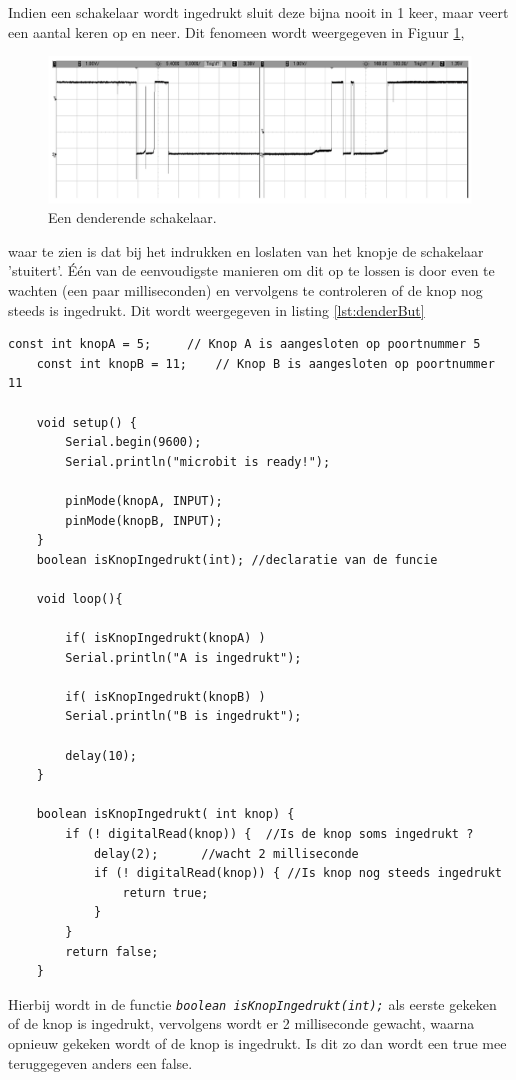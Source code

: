 Indien een schakelaar wordt ingedrukt sluit deze bijna nooit in 1 keer, maar veert een aantal keren op en neer. Dit fenomeen wordt weergegeven in Figuur \ref{fig:swDend}, 
\begin{figure}[h!]
	\captionsetup{justification=centering}
	\includegraphics[width=0.6 \linewidth]{figuren/denderen}
	\centering
	\caption{Een denderende schakelaar\cite{williams2014make}.}
	\label{fig:swDend}
\end{figure}
waar te zien is dat bij het indrukken en loslaten van het knopje de schakelaar 'stuitert'. 
Één van de eenvoudigste manieren om dit op te lossen is door even te wachten (een paar milliseconden) en vervolgens te controleren of de knop nog steeds is ingedrukt. Dit wordt weergegeven in listing \ref{lst:denderBut}
\begin{lstlisting}[caption= Omgaan met een denderende schakelaar.,label={lst:denderBut}]
	const int knopA = 5;     // Knop A is aangesloten op poortnummer 5
	const int knopB = 11;    // Knop B is aangesloten op poortnummer 11
	
	void setup() {  
		Serial.begin(9600);
		Serial.println("microbit is ready!");
		
		pinMode(knopA, INPUT);  
		pinMode(knopB, INPUT);   
	}
	boolean isKnopIngedrukt(int); //declaratie van de funcie
	
	void loop(){
		
		if( isKnopIngedrukt(knopA) )
		Serial.println("A is ingedrukt");
		
		if( isKnopIngedrukt(knopB) )
		Serial.println("B is ingedrukt");       
		
		delay(10);
	}
	
	boolean isKnopIngedrukt( int knop) {
		if (! digitalRead(knop)) {  //Is de knop soms ingedrukt ?
			delay(2);      //wacht 2 milliseconde 
			if (! digitalRead(knop)) { //Is knop nog steeds ingedrukt
				return true;
			}
		}
		return false;
	}
\end{lstlisting}

Hierbij wordt in de functie \texttt{\textit{\textcolor{arduinoBlue}{boolean} isKnopIngedrukt(\textcolor{arduinoBlue}{int});}} als eerste gekeken of de knop is ingedrukt, vervolgens wordt er 2 milliseconde gewacht, waarna opnieuw gekeken wordt of de knop is ingedrukt. Is dit zo dan wordt een \textcolor{arduinoBlue}{true} mee teruggegeven anders een \textcolor{arduinoBlue}{false}.

